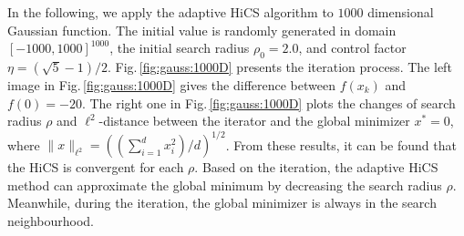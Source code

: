 \documentclass[final,1p,times]{elsarticle}
\begin{document}
In the following, we apply the adaptive HiCS algorithm to $1000$ dimensional
Gaussian function. The initial value is randomly generated in
domain $[-1000,1000]^{1000}$, the initial search radius $\rho_0 = 2.0$,
and control factor $\eta=(\sqrt{5}-1)/2$. 
Fig.\,\ref{fig:gauss:1000D} presents the iteration process.
The left image in Fig.\,\ref{fig:gauss:1000D} gives
the difference between $f(x_k)$ and $f(0)=-20$. 
The right one in Fig.\,\ref{fig:gauss:1000D} 
plots the changes of search radius $\rho$ and $\ell^2$-distance between
the iterator and the global minimizer $x^*=0$, where $\|x\|_{\ell^2}=\left(
(\sum_{i=1}^d x_i^2) / d\right)^{1/2}$.
From these results, it can be found that the HiCS is convergent
for each $\rho$. Based on the iteration, the adaptive HiCS method
can approximate the global minimum by decreasing the search radius $\rho$. 
Meanwhile, during the iteration, the global minimizer is always in the
search neighbourhood. 
\end{document}
